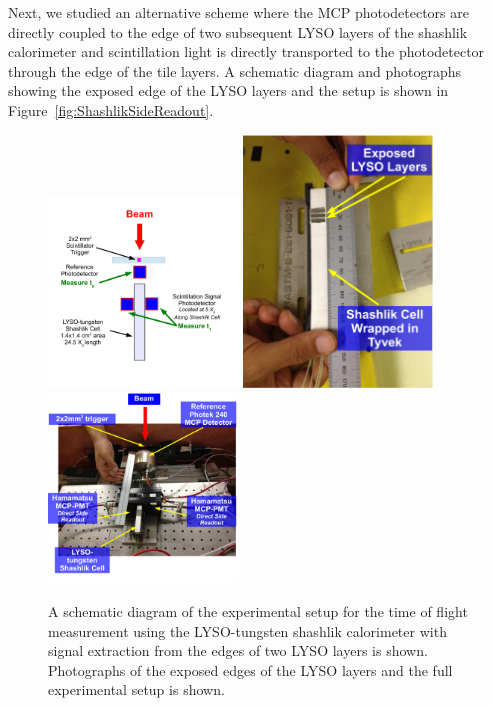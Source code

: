 \documentclass[11pt]{article}
\begin{document}
Next, we studied an alternative scheme where the MCP photodetectors
are directly coupled to the edge of two subsequent LYSO layers of the
shashlik calorimeter and scintillation light is directly transported 
to the photodetector through the edge of the tile layers. 
A schematic diagram and photographs showing the exposed edge
of the LYSO layers and the setup is shown in Figure~\ref{fig:ShashlikSideReadout}.

\begin{figure}[h] \centering
\includegraphics[width=0.45\textwidth]{figs/ShashlikSideReadoutSetupSchematic} 
\includegraphics[width=0.45\textwidth]{figs/ShashlikSideReadoutPhotoA} 
\includegraphics[width=0.45\textwidth]{figs/ShashlikSideReadoutPhotoB} 
\caption{ A schematic diagram of the experimental setup for the
time of flight measurement using the LYSO-tungsten shashlik calorimeter
with signal extraction from the edges of two LYSO layers is shown. Photographs
of the exposed edges of the LYSO layers and the full experimental setup is shown. } 
\label{fig:ShashlikSideReadoutSetup}
\end{figure}
\end{document}
